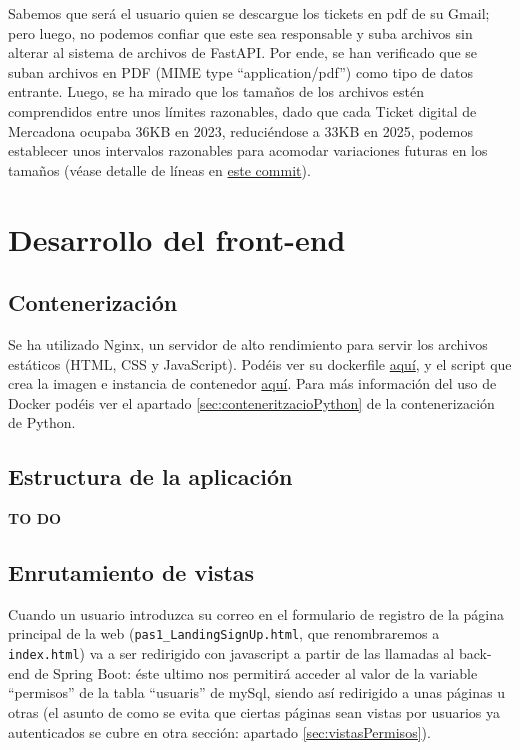 \documentclass[a4paper,12pt]{report}
\begin{document}
	Sabemos que será el usuario quien se descargue los tickets en pdf de su Gmail; pero luego, no podemos confiar que este sea responsable y suba archivos sin alterar al sistema de archivos de FastAPI. Por ende, se han verificado que se suban archivos en PDF (MIME type ``application/pdf'') como tipo de datos entrante. Luego, se ha mirado que los tamaños de los archivos estén comprendidos entre unos límites razonables, dado que cada Ticket digital de Mercadona ocupaba 36KB en 2023, reduciéndose a 33KB en 2025, podemos establecer unos intervalos razonables para acomodar variaciones futuras en los tamaños (véase detalle de líneas en \href{https://github.com/blackcub3s/mercApp/blob/88fce1d375b0ca0d59814bbda12e42573be376b6/APP%20WEB/__FastAPI__/app/controlador.py#L13-L14}{este commit}).
	
	
	
	\section{Desarrollo del front-end}
	
	\subsection{Contenerización}
	
	Se ha utilizado Nginx, un servidor de alto rendimiento para servir los archivos estáticos (HTML, CSS y JavaScript). Podéis ver su dockerfile \href{https://github.com/blackcub3s/mercApp/blob/main/APP%20WEB/__frontend__produccio__/Dockerfile}{aquí}, y el script que crea la imagen e instancia de contenedor \href{https://github.com/blackcub3s/mercApp/blob/main/APP%20WEB/__frontend__produccio__/creaImatge_i_arrancaContenidor.sh}{aquí}. Para más información del uso de Docker podéis ver el apartado \ref{sec:conteneritzacioPython} de la contenerización de Python.
	
	\subsection{Estructura de la aplicación}
	\label{sec:estructuraAplicacionFrontEnd}
	
	\textbf{TO DO}
	
	\subsection{Enrutamiento de vistas}
	\label{sec:EnrutamientoDeVistas}
	
	Cuando un usuario introduzca su correo en el formulario de registro de la página principal de la web (\texttt{pas1\_LandingSignUp.html}, que renombraremos a \texttt{index.html}) va a ser redirigido con javascript a partir de las llamadas al back-end de Spring Boot: éste ultimo nos permitirá acceder al valor de la variable ``permisos'' de la tabla ``usuaris'' de mySql, siendo así redirigido a unas páginas u otras (el asunto de como se evita que ciertas páginas sean vistas por usuarios ya autenticados se cubre en otra sección: apartado \ref{sec:vistasPermisos}).
	
\end{document}
